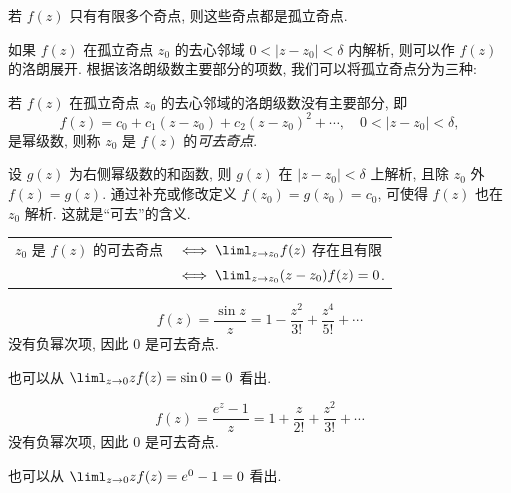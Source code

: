 若 $f(z)$ 只有有限多个奇点, 则这些奇点都是孤立奇点.

如果 $f(z)$ 在孤立奇点 $z_0$ 的去心邻域 $0<|z-z_0|<\delta$ 内解析, 则可以作 $f(z)$ 的洛朗展开.
根据该洛朗级数主要部分的项数, 我们可以将孤立奇点分为三种:

\begin{definition}
	若 $f(z)$ 在孤立奇点 $z_0$ 的去心邻域的洛朗级数没有主要部分, 即
	\[f(z)=c_0+c_1(z-z_0)+c_2(z-z_0)^2+\cdots,\quad 0<|z-z_0|<\delta,\]
	是幂级数, 则称 $z_0$ 是 $f(z)$ 的\emph{可去奇点}.
\end{definition}

设 $g(z)$ 为右侧幂级数的和函数, 则 $g(z)$ 在 $|z-z_0|<\delta$ 上解析,
且除 $z_0$ 外 $f(z)=g(z)$.
通过补充或修改定义 $f(z_0)=g(z_0)=c_0$, 可使得 $f(z)$ 也在 $z_0$ 解析.
这就是``可去''的含义.

\begin{theorem}
	\begin{tabular}{rl}
		$z_0$ 是 $f(z)$ 的可去奇点
		&$\iff\liml_{z\to z_0}f(z)$ 存在且有限\\
		&$\iff\liml_{z\to z_0}(z-z_0)f(z)=0$.
	\end{tabular}
\end{theorem}

\begin{example}
		\[f(z)=\frac{\sin z}z=1-\dfrac{z^2}{3!}+\dfrac{z^4}{5!}+\cdots\]
		没有负幂次项, 因此 $0$ 是可去奇点.

	{也可以从 $\liml_{z\to0}zf(z)=\sin 0=0$ 看出.
	}
\end{example}

\begin{example}
		\[f(z)=\frac{e^z-1}z=1+\dfrac z{2!}+\dfrac{z^2}{3!}+\cdots\]
		没有负幂次项, 因此 $0$ 是可去奇点.

	{也可以从 $\liml_{z\to0}zf(z)=e^0-1=0$ 看出.
	}
\end{example}

